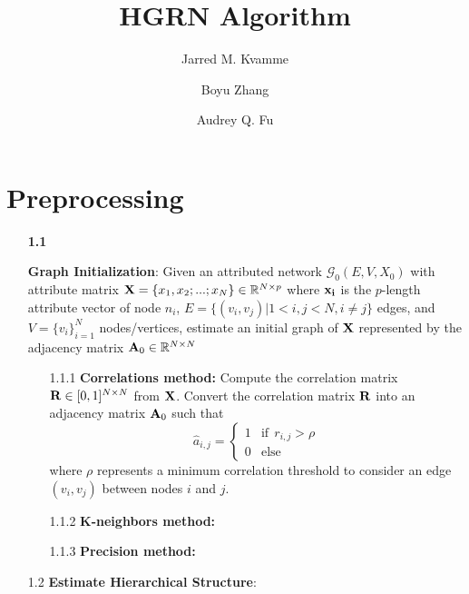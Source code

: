 \documentclass[a4paper,12pt]{article}
\begin{document}
	\begin{titlepage}
		\title{HGRN Algorithm}
		\author[1]{Jarred M. Kvamme}
		\author[2]{Boyu Zhang}
		\author[1,3]{Audrey Q. Fu}
		\maketitle
	\end{titlepage}
	
	
	\newpage
	\tableofcontents{}
	\listoftables
	\listoffigures
	\newpage
	
	
	
	
	
	\section{Preprocessing}
	\begin{itemize}
		\item[\bf 1.1]{\textbf{Graph Initialization}: Given an attributed network $\mathcal{G}_0(E,V,X_0)$ with attribute matrix ${\bf X} =\{x_1, x_2;...;x_N\} \in \mathbb{R}^{N \times p}$ where $\bf x_i$ is the $p$-length attribute vector of node $n_i$, $E = \{ (v_i, v_j)| 1<i, j<N, i\neq j\}$ edges, and $V = \{v_i\}_{i=1}^N$ nodes/vertices, estimate an initial graph of $\bf X$ represented by the adjacency matrix ${\bf A}_0 \in \mathbb{R}^{N\times N}$ 
		\begin{itemize}
			\item[1.1.1]{\textbf{Correlations method:} Compute the correlation matrix ${\bf R}\in[0,1]^{N\times N}$ from $\bf X$. Convert the correlation matrix $\bf R$ into an adjacency matrix ${\bf A}_0$ such that 
				\[ \hat{a}_{i,j} = \begin{cases}
					1 & \text{if} \ \  r_{i,j} > \rho \\
					0 & \text{else}
				\end{cases} \] 
			where $\rho$ represents a minimum correlation threshold to consider an edge $(v_i, v_j)$ between nodes $i$ and $j$.}
			
			\item[1.1.2]{\textbf{K-neighbors method:} }
			
			\item[1.1.3]{\textbf{Precision method:}}
		\end{itemize} }
	
	\item[1.2]{\textbf{Estimate Hierarchical Structure}:} 
		
	\end{itemize}
	
\end{document}
